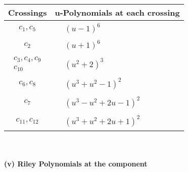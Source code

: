 \documentclass[1p]{elsarticle_modified}
\theoremstyle{definition}
\begin{document}
\begin{tabular}{m{50pt}|m{274pt}}
Crossings & \hspace{64pt}u-Polynomials at each crossing \\
\hline $$\begin{aligned}c_{1},c_{5}\end{aligned}$$&$\begin{aligned}
&(u-1)^6
\end{aligned}$\\
\hline $$\begin{aligned}c_{2}\end{aligned}$$&$\begin{aligned}
&(u+1)^6
\end{aligned}$\\
\hline $$\begin{aligned}c_{3},c_{4},c_{9}\\c_{10}\end{aligned}$$&$\begin{aligned}
&(u^2+2)^3
\end{aligned}$\\
\hline $$\begin{aligned}c_{6},c_{8}\end{aligned}$$&$\begin{aligned}
&(u^3+u^2-1)^2
\end{aligned}$\\
\hline $$\begin{aligned}c_{7}\end{aligned}$$&$\begin{aligned}
&(u^3- u^2+2 u-1)^2
\end{aligned}$\\
\hline $$\begin{aligned}c_{11},c_{12}\end{aligned}$$&$\begin{aligned}
&(u^3+u^2+2 u+1)^2
\end{aligned}$\\
\hline
\end{tabular}\\~\\
\newpage\renewcommand{\arraystretch}{1}
\flushleft \textbf{(v) Riley Polynomials at the component}\newline \\
\end{document}
